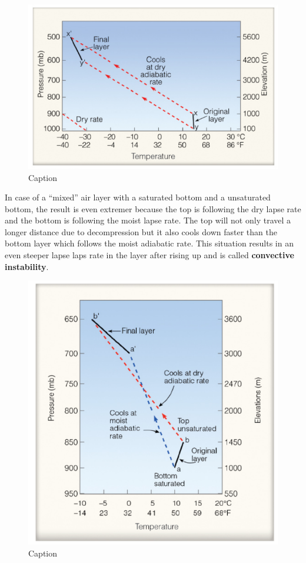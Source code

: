 \documentclass[12pt,oneside]{book}
\begin{document}
\begin{figure}

{\centering \includegraphics[width=0.9\linewidth]{figures/Figure314} 

}

\caption{Caption}\label{fig:Lifting}
\end{figure}

In case of a ``mixed'' air layer with a saturated bottom and a
unsaturated bottom, the result is even extremer because the top is
following the dry lapse rate and the bottom is following the moist lapse
rate. The top will not only travel a longer distance due to
decompression but it also cools down faster than the bottom layer which
follows the moist adiabatic rate. This situation results in an even
steeper lapse laps rate in the layer after rising up and is called
\textbf{convective instability}.

\begin{figure}

{\centering \includegraphics[width=0.9\linewidth]{figures/Figure315} 

}

\caption{Caption}\label{fig:Lifting2}
\end{figure}
\end{document}

